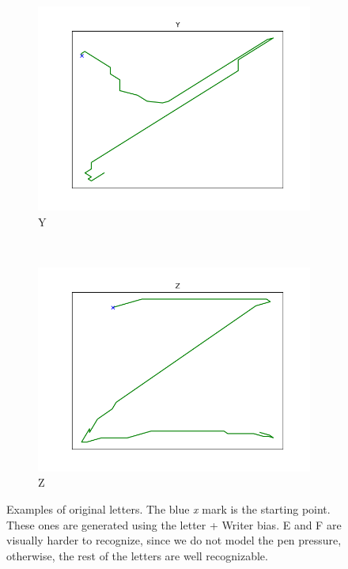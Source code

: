 \begin{figure}
\begin{subfigure}[b]{0.14\textwidth}
        \includegraphics[width=\textwidth]{images/gbem/orig_letters_fig/AORIG_letter_Y_writer_5.png}
        \caption{Y}
    \end{subfigure}
    ~
    \begin{subfigure}[b]{0.14\textwidth}
        \includegraphics[width=\textwidth]{images/gbem/orig_letters_fig/AORIG_letter_Z_writer_15.png}
        \caption{Z}
    \end{subfigure}

    \caption{Examples of original letters. The blue \textit{x} mark is the starting point. These ones are generated using the letter + Writer bias. E and F are visually harder to recognize, since we do not model the pen pressure, otherwise, the rest of the letters are well recognizable.}\label{fig:orig_letters_examples}
\end{figure}

